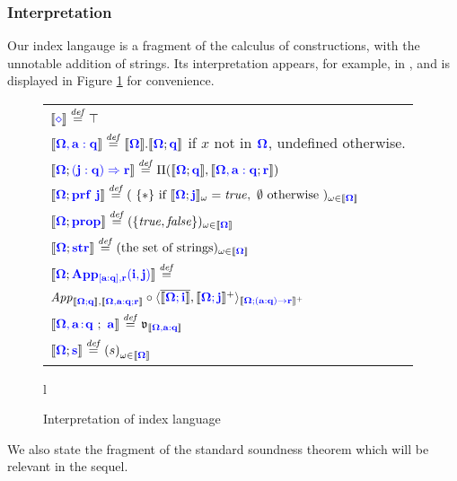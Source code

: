 \documentclass[sigplan,10pt,review,anonymous]{acmart}
\newcommand{\blum}[1]{\mathbf{\color{blue}{#1}}}
\newcommand{\defeq}{\overset{\mathit{def}}{=}}
\newcommand{\sem}[1]{\llbracket #1 \rrbracket}
\newcommand{\fm}[2]{
\left(
\tiny
#1
\normalsize
\right)_{#2}
}
\begin{document}
\subsubsection{Interpretation}

Our index langauge is a fragment of the calculus of constructions, with the unnotable addition of strings. Its interpretation appears, for example, in \cite{}, and is displayed in Figure \ref{fig:index-interp} for convenience. 

\begin{figure}
\begin{small}
\begin{tabular}{l}
$\sem{\blum{\diamond}} \defeq \top$ \\
$\sem{\blum{\Omega,a:q}} \defeq \sem{\blum{\Omega}}.\sem{\blum{\Omega};\blum{q}}$ if $x$ not in $\blum{\Omega}$, undefined otherwise.\\
$\sem{\blum{\Omega}; \blum{(j : q) \Rightarrow r}} \defeq \Pi(\sem{\blum{\Omega};\blum{q}},\sem{\blum{\Omega,a:q};\blum{r}})$ \\
$\sem{\blum{\Omega}; \blum{\mathbf{prf}~j}} \defeq (~\{ \ast \} \text{ if } \sem{\blum{\Omega}; \blum{j}}_\omega = \mathit{true}, \text{~}\emptyset\text{ otherwise}~)_{\omega \in \sem{\blum{\Omega}}}$ \\
$\sem{\blum{\Omega}; \blum{prop}} \defeq ( \{ \mathit{true}, \mathit{false} \} )_{\omega \in \sem{\blum{\Omega}}}$\\
$\sem{\blum{\Omega}; \blum{str}} \defeq (\text{the set of strings})_{\omega \in \sem{\blum{\Omega}}}$\\
$\sem{\blum{\Omega}; \blum{App_{[a:q],r}(i,j)}} \defeq$ \\
\hspace{1.5ex} $\mathit{App}_{\sem{\blum{\Omega;q}},\sem{\blum{\Omega,a:q;r}}} \circ \langle \overline{\sem{\blum{\Omega ; i}}}, \sem{\blum{\Omega ; j}}^+ \rangle_{\sem{\blum{\Omega ; \blum{(a : q) \to r}}}^+}$ \\
$\sem{\blum{\Omega,a \! : \! q}~;~\blum{a}} \defeq \frak{v}_{\sem{\blum{\Omega,a:q}}}$ \\
$\sem{\blum{\Omega};\blum{s}} \defeq \fm{s}{\omega \in \sem{\blum{\Omega}}}$
\end{tabular}{l}
\end{small}
\caption{Interpretation of index language}
\label{fig:index-interp}
\end{figure}

We also state the fragment of the standard soundness theorem which will be relevant in the sequel. 
\end{document}

